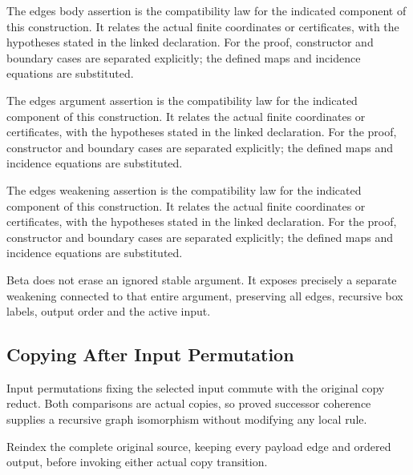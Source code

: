 The edges body assertion is the compatibility law for the indicated component of this construction. It relates the actual finite coordinates or certificates, with the hypotheses stated in the linked declaration.
For the proof, constructor and boundary cases are separated explicitly; the defined maps and incidence equations are substituted.
\par{}

The edges argument assertion is the compatibility law for the indicated component of this construction. It relates the actual finite coordinates or certificates, with the hypotheses stated in the linked declaration.
For the proof, constructor and boundary cases are separated explicitly; the defined maps and incidence equations are substituted.
\par{}

The edges weakening assertion is the compatibility law for the indicated component of this construction. It relates the actual finite coordinates or certificates, with the hypotheses stated in the linked declaration.
For the proof, constructor and boundary cases are separated explicitly; the defined maps and incidence equations are substituted.
\par{}

Beta does not erase an ignored stable argument. It exposes precisely a separate weakening connected to that entire argument, preserving all edges, recursive box labels, output order and the active input.
\par{}

\subsection{Copying After Input Permutation}
Input permutations fixing the selected input commute with the original copy reduct. Both comparisons are actual copies, so proved successor coherence supplies a recursive graph isomorphism without modifying any local rule.

Reindex the complete original source, keeping every payload edge and ordered output, before invoking either actual copy transition.
\par{}

